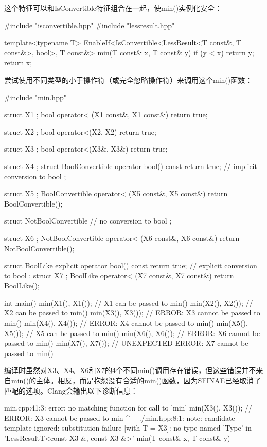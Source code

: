 这个特征可以和IsConvertible特征组合在一起，使min()实例化安全：

\begin{cpp}
#include "isconvertible.hpp"
#include "lessresult.hpp"

template<typename T>
EnableIf<IsConvertible<LessResult<T const&, T const&>, bool>,
		T const&>
min(T const& x, T const& y)
{
	if (y < x) {
		return y;
	}
	return x;
}
\end{cpp}

尝试使用不同类型的小于操作符（或完全忽略操作符）来调用这个min()函数：

\begin{cpp}
#include "min.hpp"

struct X1 { };
bool operator< (X1 const&, X1 const&) { return true; }

struct X2 { };
bool operator<(X2, X2) { return true; }

struct X3 { };
bool operator<(X3&, X3&) { return true; }

struct X4 { };
struct BoolConvertible {
	operator bool() const { return true; } // implicit conversion to bool
};

struct X5 { };
BoolConvertible operator< (X5 const&, X5 const&)
{
	return BoolConvertible();
}

struct NotBoolConvertible { // no conversion to bool
};

struct X6 { };
NotBoolConvertible operator< (X6 const&, X6 const&)
{
	return NotBoolConvertible();
}

struct BoolLike {
	explicit operator bool() const { return true; } // explicit conversion to bool
};
struct X7 { };
BoolLike operator< (X7 const&, X7 const&) { return BoolLike(); }

int main()
{
	min(X1(), X1()); // X1 can be passed to min()
	min(X2(), X2()); // X2 can be passed to min()
	min(X3(), X3()); // ERROR: X3 cannot be passed to min()
	min(X4(), X4()); // ERROR: X4 cannot be passed to min()
	min(X5(), X5()); // X5 can be passed to min()
	min(X6(), X6()); // ERROR: X6 cannot be passed to min()
	min(X7(), X7()); // UNEXPECTED ERROR: X7 cannot be passed to min()
}
\end{cpp}

编译时虽然对X3、X4、X6和X7的4个不同min()调用存在错误，但这些错误并不来自min()的主体。相反，而是抱怨没有合适的min()函数，因为SFINAE已经取消了匹配的选项。Clang会输出以下诊断信息：

\begin{shell}
min.cpp:41:3: error: no matching function for call to 'min'
min(X3(), X3()); // ERROR: X3 cannot be passed to min
^~~
./min.hpp:8:1: note: candidate template ignored: substitution failure
[with T = X3]: no type named 'Type' in
'LessResultT<const X3 &, const X3 &>'
min(T const& x, T const& y)
\end{shell}

